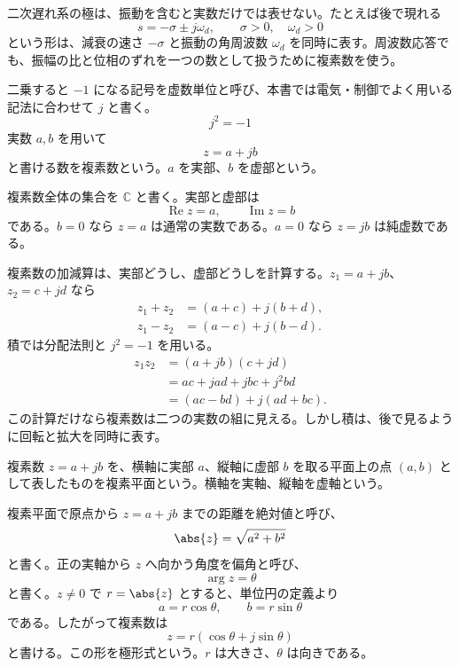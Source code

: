 二次遅れ系の極は、振動を含むと実数だけでは表せない。たとえば後で現れる
\begin{equation}
  s=-\sigma\pm j\omega_d,\qquad \sigma>0,\quad \omega_d>0
\end{equation}
という形は、減衰の速さ $-\sigma$ と振動の角周波数 $\omega_d$ を同時に表す。周波数応答でも、振幅の比と位相のずれを一つの数として扱うために複素数を使う。

\begin{definition}[虚数単位と複素数]
二乗すると $-1$ になる記号を虚数単位と呼び、本書では電気・制御でよく用いる記法に合わせて $j$ と書く。
\begin{equation}
  j^2=-1
\end{equation}
実数 $a,b$ を用いて
\begin{equation}
  z=a+jb
\end{equation}
と書ける数を複素数という。$a$ を実部、$b$ を虚部という。
\end{definition}

複素数全体の集合を $\mathbb{C}$ と書く。実部と虚部は
\begin{equation}
  \operatorname{Re}z=a,\qquad
  \operatorname{Im}z=b
\end{equation}
である。$b=0$ なら $z=a$ は通常の実数である。$a=0$ なら $z=jb$ は純虚数である。

複素数の加減算は、実部どうし、虚部どうしを計算する。$z_1=a+jb$、$z_2=c+jd$ なら
\begin{align}
  z_1+z_2&=(a+c)+j(b+d),\\
  z_1-z_2&=(a-c)+j(b-d).
\end{align}
積では分配法則と $j^2=-1$ を用いる。
\begin{align}
  z_1z_2
  &=(a+jb)(c+jd)\\
  &=ac+jad+jbc+j^2bd\\
  &=(ac-bd)+j(ad+bc).
\end{align}
この計算だけなら複素数は二つの実数の組に見える。しかし積は、後で見るように回転と拡大を同時に表す。

\begin{definition}[複素平面]
複素数 $z=a+jb$ を、横軸に実部 $a$、縦軸に虚部 $b$ を取る平面上の点 $(a,b)$ として表したものを複素平面という。横軸を実軸、縦軸を虚軸という。
\end{definition}

複素平面で原点から $z=a+jb$ までの距離を絶対値と呼び、
\begin{equation}
  \abs{z}=\sqrt{a^2+b^2}
\end{equation}
と書く。正の実軸から $z$ へ向かう角度を偏角と呼び、
\begin{equation}
  \arg z=\theta
\end{equation}
と書く。$z\ne0$ で $r=\abs{z}$ とすると、単位円の定義より
\begin{equation}
  a=r\cos\theta,\qquad b=r\sin\theta
\end{equation}
である。したがって複素数は
\begin{equation}
  z=r(\cos\theta+j\sin\theta)
\end{equation}
と書ける。この形を極形式という。$r$ は大きさ、$\theta$ は向きである。

